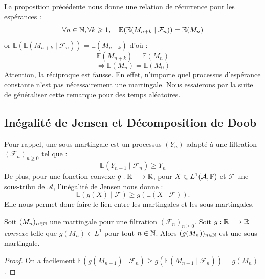 \begin{remark}
    La proposition précédente nous donne une relation de récurrence pour les espérances : 
        $$ \forall n \in \mathbb{N}, \forall k \geqslant 1, \quad \mathbb{E}( \mathbb{E}(M_{n+k} \mid \mathcal{F}_n)) = \mathbb{E}(M_n) $$ 
    or $ \mathbb{E}( \mathbb{E}(M_{n+k} \mid \mathcal{F}_n)) = \mathbb{E}(M_{n+k})$ d'où : 
        $$ \mathbb{E}(M_{n+k}) = \mathbb{E}(M_n) $$ 
        $$ \iff \boxed{ \mathbb{E}(M_n) = \mathbb{E}(M_0)} $$ 
    Attention, la réciproque est fausse. En effet, n'importe quel processus d'espérance constante n'est pas 
    nécessairement une martingale. 
    Nous essaierons par la suite de généraliser cette remarque pour des temps aléatoires. 
\end{remark}

\subsection{Inégalité de Jensen et Décomposition de Doob}

Pour rappel, une sous-martingale est un processus $(Y_n)$ adapté à une filtration $ ( \mathcal{F}_n)_{n \geqslant 0}$ tel que : 
    $$ \mathbb{E}(Y_{n+1} \mid \mathcal{F}_n) \geqslant Y_n $$ 
De plus, pour une fonction convexe $g : \mathbb{R} \longrightarrow \mathbb{R}$, pour $X \in L^1( \mathcal{A}, \mathbb{P})$
et $ \mathcal{F}$ une sous-tribu de $ \mathcal{A}$, l'inégalité de Jensen nous donne :
    $$ \mathbb{E}(g(X) \mid \mathcal{F}) \geqslant g( \mathbb{E}(X \mid \mathcal{F})).$$ 
Elle nous permet donc faire le lien entre les martingales et les sous-martingales. 

\begin{corollary}\label{corollary:inegalite-jensen}
    Soit $(M_n)_{n \in \mathbb{N}}$ une martingale pour une filtration $ (\mathcal{F}_n)_{n \geqslant 0}$. 
    Soit $g : \mathbb{R} \longrightarrow \mathbb{R}$ \emph{convexe} telle que $g(M_n) \in L^1$ pour tout $n \in \mathbb{N}$.
    Alors $(g(M_n))_{n \in \mathbb{N}}$ est une sous-martingale. 
\end{corollary}

\begin{proof}
    On a facilement $ \mathbb{E}(g(M_{n+1}) \mid \mathcal{F}_n) \geqslant g( \mathbb{E}(M_{n+1} \mid \mathcal{F}_n)) = g(M_n)$. 
\end{proof}

